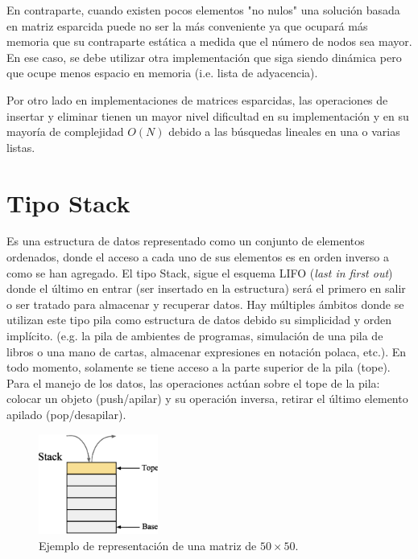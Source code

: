 En contraparte, cuando existen pocos elementos "no nulos" una solución basada en matriz esparcida puede no ser la más conveniente ya que ocupará más memoria que su contraparte estática a medida que el número de nodos sea mayor. En ese caso, se debe utilizar otra implementación que siga siendo dinámica pero que ocupe menos espacio en memoria (i.e. lista de adyacencia).

Por otro lado en implementaciones de matrices esparcidas, las operaciones de insertar y eliminar tienen un mayor nivel dificultad en su implementación y en su mayoría de complejidad $O(N)$ debido a las búsquedas lineales en una o varias listas.

\section{Tipo Stack}

Es una estructura de datos representado como un conjunto de elementos ordenados, donde el acceso a cada uno de sus elementos es en orden inverso a como se han agregado. El tipo Stack, sigue el esquema LIFO (\textit{last in first out}) donde el último en entrar (ser insertado en la estructura) será el primero en salir o ser tratado para almacenar y recuperar datos. Hay múltiples ámbitos donde se utilizan este tipo pila como estructura de datos debido su simplicidad y orden implícito. (e.g. la pila de ambientes de programas, simulación de una pila de libros o una mano de cartas, almacenar expresiones en notación polaca, etc.). En todo momento, solamente se tiene acceso a la parte superior de la pila (tope).  Para el manejo de los datos, las operaciones actúan sobre el tope de la pila: colocar un objeto (push/apilar) y su operación inversa, retirar el último elemento apilado (pop/desapilar).

\begin{figure}[htp!]
  \begin{center}
    \includegraphics[width=0.35\textwidth]{images/stack.eps}
  \end{center}
  \caption{Ejemplo de representación de una matriz de $50 \times 50$.}
  \label{fig:stack1}
\end{figure}

